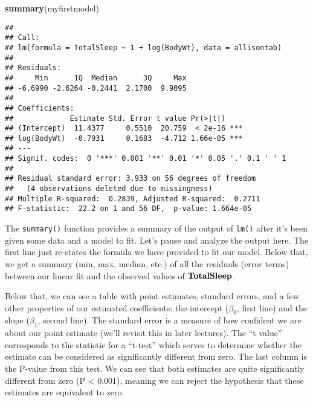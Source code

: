 \documentclass[
]{book}
\newenvironment{Shaded}{\begin{snugshade}}{\end{snugshade}}
\newcommand{\KeywordTok}[1]{\textcolor[rgb]{0.13,0.29,0.53}{\textbf{#1}}}
\newcommand{\NormalTok}[1]{#1}
\begin{document}
\begin{Shaded}
\begin{Highlighting}[]
\KeywordTok{summary}\NormalTok{(myfirstmodel)}
\end{Highlighting}
\end{Shaded}

\begin{verbatim}
## 
## Call:
## lm(formula = TotalSleep ~ 1 + log(BodyWt), data = allisontab)
## 
## Residuals:
##     Min      1Q  Median      3Q     Max 
## -6.6990 -2.6264 -0.2441  2.1700  9.9095 
## 
## Coefficients:
##             Estimate Std. Error t value Pr(>|t|)    
## (Intercept)  11.4377     0.5510  20.759  < 2e-16 ***
## log(BodyWt)  -0.7931     0.1683  -4.712 1.66e-05 ***
## ---
## Signif. codes:  0 '***' 0.001 '**' 0.01 '*' 0.05 '.' 0.1 ' ' 1
## 
## Residual standard error: 3.933 on 56 degrees of freedom
##   (4 observations deleted due to missingness)
## Multiple R-squared:  0.2839, Adjusted R-squared:  0.2711 
## F-statistic:  22.2 on 1 and 56 DF,  p-value: 1.664e-05
\end{verbatim}

The \texttt{summary()} function provides a summary of the output of \texttt{lm()} after it's been given some data and a model to fit. Let's pause and analyze the output here. The first line just re-states the formula we have provided to fit our model. Below that, we get a summary (min, max, median, etc.) of all the residuals (error terms) between our linear fit and the observed values of \(\bf{TotalSleep}\).

Below that, we can see a table with point estimates, standard errors, and a few other properties of our estimated coefficients: the intercept (\(\beta_0\), first line) and the slope (\(\beta_1\), second line). The standard error is a measure of how confident we are about our point estimate (we'll revisit this in later lectures). The ``t value'' corresponds to the statistic for a ``t-test'' which serves to determine whether the estimate can be considered as significantly different from zero. The last column is the P-value from this test. We can see that both estimates are quite significantly different from zero (P \textless{} 0.001), meaning we can reject the hypothesis that these estimates are equivalent to zero.
\end{document}
